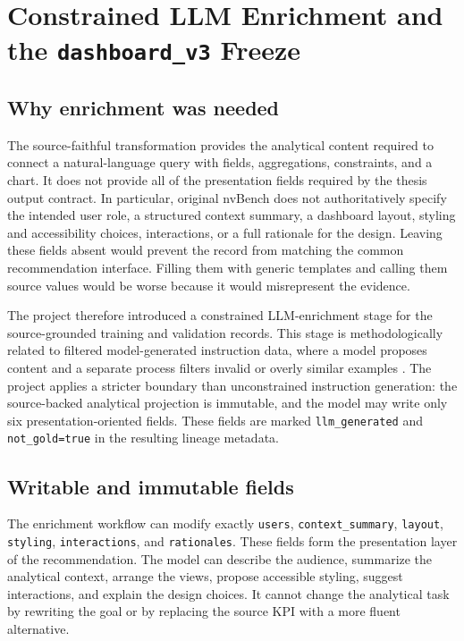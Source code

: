 \section{\texorpdfstring{Constrained LLM Enrichment and the \texttt{dashboard\_v3} Freeze}{Constrained LLM Enrichment and the dashboard\_v3 Freeze}}

\subsection{Why enrichment was needed}

The source-faithful transformation provides the analytical content required to connect a natural-language query with fields, aggregations, constraints, and a chart. It does not provide all of the presentation fields required by the thesis output contract. In particular, original nvBench does not authoritatively specify the intended user role, a structured context summary, a dashboard layout, styling and accessibility choices, interactions, or a full rationale for the design. Leaving these fields absent would prevent the record from matching the common recommendation interface. Filling them with generic templates and calling them source values would be worse because it would misrepresent the evidence.

The project therefore introduced a constrained LLM-enrichment stage for the source-grounded training and validation records. This stage is methodologically related to filtered model-generated instruction data, where a model proposes content and a separate process filters invalid or overly similar examples \cite{wang2023selfinstruct}. The project applies a stricter boundary than unconstrained instruction generation: the source-backed analytical projection is immutable, and the model may write only six presentation-oriented fields. These fields are marked \texttt{llm\_generated} and \texttt{not\_gold=true} in the resulting lineage metadata.

\subsection{Writable and immutable fields}

The enrichment workflow can modify exactly \texttt{users}, \texttt{context\_summary}, \texttt{layout}, \texttt{styling}, \texttt{interactions}, and \texttt{rationales}. These fields form the presentation layer of the recommendation. The model can describe the audience, summarize the analytical context, arrange the views, propose accessible styling, suggest interactions, and explain the design choices. It cannot change the analytical task by rewriting the goal or by replacing the source KPI with a more fluent alternative.

